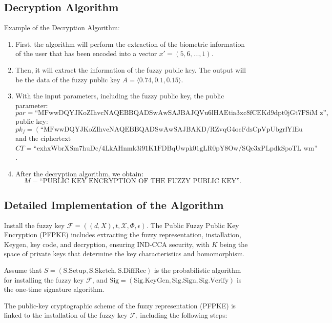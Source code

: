 \documentclass[graybox]{svmult}
\begin{document}
\subsection{Decryption Algorithm}

Example of the Decryption Algorithm:
\begin{enumerate}
    \item First, the algorithm will perform the extraction of the biometric information of the user that has been encoded into a vector $x' = (5, 6, \dots, 1)$.
    \item Then, it will extract the information of the fuzzy public key. The output will be the data of the fuzzy public key $A = \langle 0.74, 0.1, 0.15 \rangle$.
    \item With the input parameters, including the fuzzy public key, the public parameter:
          \[
              par = \text{``MFwwDQYJKoZIhvcNAQEBBQADSwAwSAJBAJQVu6lHAEtia3xc8fCEKd9dpt0jGt7FSiM z''},
          \]
          public key:
          \[
              pk_f = (\text{``MFwwDQYJKoZIhvcNAQEBBQADSwAwSAJBAKD/RZvqG4ocFdsCpVpUbgrlYlEu mD9qebAIVm3gv1Y6XN7w6jf2B4V9soP9jbXcmwEDy/N6xognyuqKAEB81JUCAwEAAQ==,''}, \dots),
          \]
          and the ciphertext $CT = \text{``exhxWbrXSm7huDc/4LkAHnmk3i91K1FDBqUwpk01gLR0pY8Ow/SQe3xPLpdkSpoTL wm''}$.
    \item After the decryption algorithm, we obtain:
          \[
              M = \text{``PUBLIC KEY ENCRYPTION OF THE FUZZY PUBLIC KEY''}.
          \]
\end{enumerate}

\subsection{Detailed Implementation of the Algorithm}
Install the fuzzy key $\mathcal{F} = ((d, X), t, \mathcal{X}, \Phi, \epsilon)$. The Public Fuzzy Public Key Encryption (PFPKE) includes extracting the fuzzy representation, installation, Keygen, key code, and decryption, ensuring IND-CCA security, with $K$ being the space of private keys that determine the key characteristics and homomorphism.

Assume that $S = (\text{S.Setup}, \text{S.Sketch}, \text{S.DiffRec})$ is the probabilistic algorithm for installing the fuzzy key $\mathcal{F}$, and $\text{Sig} = (\text{Sig.KeyGen}, \text{Sig.Sign}, \text{Sig.Verify})$ is the one-time signature algorithm.

The public-key cryptographic scheme of the fuzzy representation (PFPKE) is linked to the installation of the fuzzy key $\mathcal{F}$, including the following steps:
\end{document}
